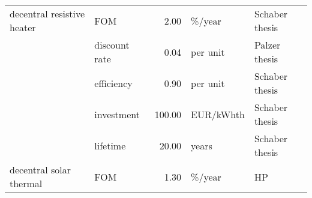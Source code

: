 \begin{longtable}{p{5cm}p{3cm}rp{3cm}p{11cm}}
decentral resistive heater & FOM &           2.00 &                            \%/year &                                                                                                                                                                                                                                                                                                                       Schaber thesis \\
                      & discount rate &           0.04 &                          per unit &                                                                                                                                                                                                                                                                                                                        Palzer thesis \\
                      & efficiency &           0.90 &                          per unit &                                                                                                                                                                                                                                                                                                                       Schaber thesis \\
                      & investment &         100.00 &                         EUR/kWhth &                                                                                                                                                                                                                                                                                                                       Schaber thesis \\
                      & lifetime &          20.00 &                             years &                                                                                                                                                                                                                                                                                                                       Schaber thesis \\
decentral solar thermal & FOM &           1.30 &                            \%/year &                                                                                                                                                                                                                                                                                                                                   HP \\

\end{longtable}

